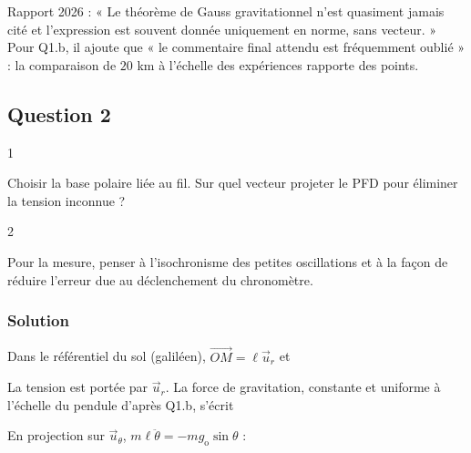 \documentclass[11pt,a4paper]{article}
\newcommand{\equationajustee}[1]{%
  \sbox{\boiteequation}{$\displaystyle #1$}%
  \ifdim\wd\boiteequation>\linewidth
    \[\resizebox{\linewidth}{!}{\usebox{\boiteequation}}\]%
  \else
    \[#1\]%
  \fi}
\begin{document}
\begin{jury}

Rapport 2026 : « Le théorème de Gauss gravitationnel n'est quasiment jamais cité et l'expression est souvent donnée uniquement en norme, sans vecteur. » Pour Q1.b, il ajoute que « le commentaire final attendu est fréquemment oublié » : la comparaison de \(20\) km à l'échelle des expériences rapporte des points.

\end{jury}

\hypertarget{question-2}{%
\subsection{Question 2}\label{question-2}}

\begin{indication}{1}

Choisir la base polaire liée au fil. Sur quel vecteur projeter le PFD pour éliminer la tension inconnue ?

\end{indication}

\begin{indication}{2}

Pour la mesure, penser à l'isochronisme des petites oscillations et à la façon de réduire l'erreur due au déclenchement du chronomètre.

\end{indication}

\hypertarget{solution-1}{%
\subsubsection{Solution}\label{solution-1}}

Dans le référentiel du sol (galiléen), \(\overrightarrow{OM}=\ell\vec u_r\) et

\equationajustee{\vec a=-\ell\dot\theta^2\vec u_r+\ell\ddot\theta\,\vec u_\theta}

La tension est portée par \(\vec u_r\). La force de gravitation, constante et uniforme à l'échelle du pendule d'après Q1.b, s'écrit

\equationajustee{\vec F=mg_{\mathrm{o}}(\cos\theta\,\vec u_r-\sin\theta\,\vec u_\theta)}

En projection sur \(\vec u_\theta\), \(m\ell\ddot\theta=-mg_{\mathrm{o}}\sin\theta\) :

\equationajustee{\boxed{\ddot\theta+\frac{g_{\mathrm{o}}}{\ell}\sin\theta=0}}
\end{document}
